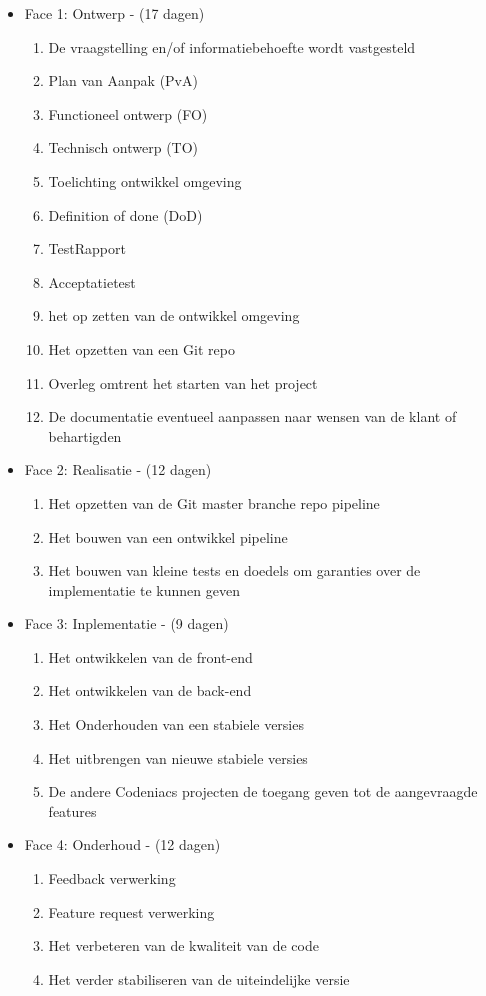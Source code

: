 \documentclass[]{report}
\begin{document}
\begin{itemize}
	\item Face 1: Ontwerp - (17 dagen)
	\begin{enumerate}
		\item De vraagstelling en/of informatiebehoefte wordt vastgesteld
		\item Plan van Aanpak (PvA)
		\item Functioneel ontwerp (FO)
		\item Technisch ontwerp (TO)
		\item Toelichting ontwikkel omgeving
		\item Definition of done (DoD)
		\item TestRapport 
		\item Acceptatietest
		\item het op zetten van de ontwikkel omgeving
		\item Het opzetten van een Git repo
		\item Overleg omtrent het starten van het project
		\item De documentatie eventueel aanpassen naar wensen van de klant of behartigden
			\newline
	\end{enumerate} 
	
	
	\item Face 2: Realisatie - (12 dagen)
	\begin{enumerate}
		\item Het opzetten van de Git master branche repo pipeline
		\item Het bouwen van een ontwikkel pipeline
		\item Het bouwen van kleine tests en doedels om garanties over de implementatie te kunnen geven
			\newline
	\end{enumerate} 
	
	
	\item Face 3: Inplementatie  - (9 dagen)
	\begin{enumerate}
		\item Het ontwikkelen van de front-end
		\item Het ontwikkelen van de back-end
		\item Het Onderhouden van een stabiele versies
		\item Het uitbrengen van nieuwe stabiele versies
		\item De andere Codeniacs projecten de toegang geven tot de aangevraagde features 
			\newline
	\end{enumerate} 


	\item Face 4: Onderhoud  - (12 dagen)
	\begin{enumerate}
		\item Feedback verwerking
		\item Feature request verwerking
		\item Het verbeteren van de kwaliteit van de code
		\item Het verder stabiliseren van de uiteindelijke versie
	\end{enumerate} 
\end{itemize} 
\end{document}
